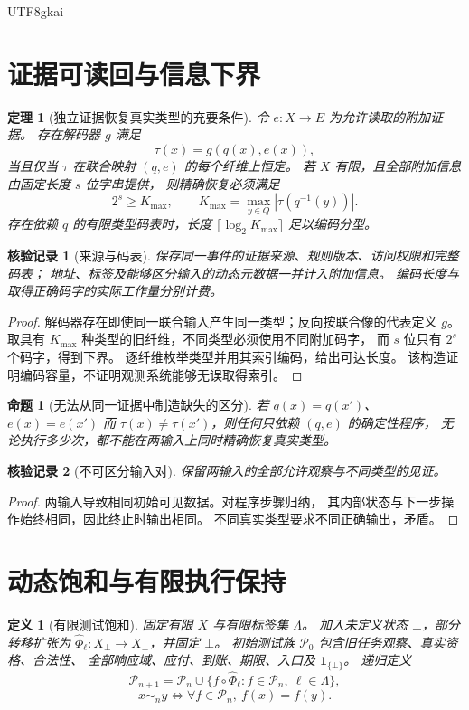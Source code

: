 \documentclass[12pt,a4paper,openany]{report}
\newtheorem{definition}{定义}[chapter]
\newtheorem{theorem}{定理}[chapter]
\newtheorem{proposition}{命题}[chapter]
\newtheorem{Certificate}{核验记录}[chapter]
\newcommand{\Ind}{\mathbf 1}
\begin{document}
\begin{CJK*}{UTF8}{gkai}
\section{证据可读回与信息下界}
\begin{theorem}[独立证据恢复真实类型的充要条件]
\label{thm:evidence}
令 \(e:X\to E\) 为允许读取的附加证据。
存在解码器 \(g\) 满足
\[
\tau(x)=g(q(x),e(x)),
\]
当且仅当 \(\tau\) 在联合映射 \((q,e)\) 的每个纤维上恒定。
若 \(X\) 有限，且全部附加信息由固定长度 \(s\) 位字串提供，
则精确恢复必须满足
\[
2^s\ge K_{\max},\qquad
K_{\max}=\max_{y\in Q}|\tau(q^{-1}(y))|.
\]
存在依赖 \(q\) 的有限类型码表时，长度
\(\lceil\log_2K_{\max}\rceil\) 足以编码分型。
\end{theorem}
\begin{Certificate}[来源与码表]
保存同一事件的证据来源、规则版本、访问权限和完整码表；
地址、标签及能够区分输入的动态元数据一并计入附加信息。
编码长度与取得正确码字的实际工作量分别计费。
\end{Certificate}
\begin{proof}
解码器存在即使同一联合输入产生同一类型；反向按联合像的代表定义 \(g\)。
取具有 \(K_{\max}\) 种类型的旧纤维，不同类型必须使用不同附加码字，
而 \(s\) 位只有 \(2^s\) 个码字，得到下界。
逐纤维枚举类型并用其索引编码，给出可达长度。
该构造证明编码容量，不证明观测系统能够无误取得索引。
\end{proof}

\begin{proposition}[无法从同一证据中制造缺失的区分]
\label{prop:identical}
若 \(q(x)=q(x')\)、\(e(x)=e(x')\) 而
\(\tau(x)\ne\tau(x')\)，则任何只依赖 \((q,e)\) 的确定性程序，
无论执行多少次，都不能在两输入上同时精确恢复真实类型。
\end{proposition}
\begin{Certificate}[不可区分输入对]
保留两输入的全部允许观察与不同类型的见证。
\end{Certificate}
\begin{proof}
两输入导致相同初始可见数据。对程序步骤归纳，
其内部状态与下一步操作始终相同，因此终止时输出相同。
不同真实类型要求不同正确输出，矛盾。
\end{proof}

\section{动态饱和与有限执行保持}
\begin{definition}[有限测试饱和]
\label{def:saturation}
固定有限 \(X\) 与有限标签集 \(\Lambda\)。
加入未定义状态 \(\bot\)，部分转移扩张为
\(\widehat\Phi_\ell:X_\bot\to X_\bot\)，并固定 \(\bot\)。
初始测试族 \(\mathcal P_0\) 包含旧任务观察、真实资格、合法性、
全部响应域、应付、到账、期限、入口及 \(\Ind_{\{\bot\}}\)。
递归定义
\[
\mathcal P_{n+1}=\mathcal P_n\cup
\{f\circ\widehat\Phi_\ell:f\in\mathcal P_n,\ \ell\in\Lambda\},
\]
\[
x\sim_n y\Longleftrightarrow
\forall f\in\mathcal P_n,\ f(x)=f(y).
\]
\end{definition}


\end{CJK*}
\end{document}
